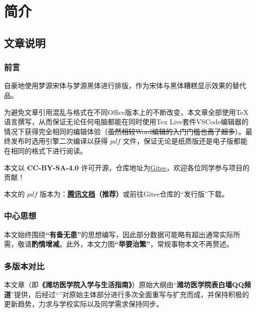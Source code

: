 \chapter[简介]{简介\vspace{-2em}}
\section[文章说明]{文章说明}
\vspace{-1em}
\subsection[前言]{前言}
\vspace{-1em}
自豪地使用梦源宋体与梦源黑体进行排版，作为宋体与黑体糟糕显示效果的替代品。

为避免文章引用混乱与格式在不同Office版本上的不断改变，本文章全部使用\TeX 语言撰写，从而保证无论任何电脑都能在同时使用Tex Live套件VSCode编辑器\footnotemark 的情况下获得完全相同的编辑体验（\sout{虽然相较Word编辑的入门门槛也高了超多}）。最终发布时选用\XeLaTeX 引擎二次编译以获得 $pdf$ 文件，保证无论是纸质版还是电子版都能在相同的格式下进行阅读。

本文以 \textbf{CC-BY-SA-4.0} 许可开源，仓库地址为\uline{\href{https://gitee.com/mikazo/guide_for_freshman}{Gitee}}，欢迎各位同学参与项目的贡献！

本文的 $pdf$ 版本\textbf{}为：\textbf{\uline{\href{https://docs.qq.com/s/ETcQ-ZFSrSsh6MK9bm773q}{腾讯文档}}（推荐）}或前往Gitee仓库的“发行版”下载。

\subsection[中心思想]{中心思想}
\vspace{-1em}
本文始终围绕\textbf{“有备无患”}的思想编写，因此部分数据可能略有超出通常实际所需，敬请\textbf{酌情增减}。此外，本文力图\textbf{“举要治繁”}，常规事物本文不再赘述。

\subsection[多版本对比]{多版本对比}
\vspace{-1em}
本文章（即\textbf{《潍坊医学院入学与生活指南》}）原始大纲由“\textbf{潍坊医学院表白墙QQ频道}”提供，后经过“\textbf{}”对原始主体部分进行多次全面重写与扩充而成，并保持积极的更新趋势，力求与学校实际以及同学需求保持同步。

